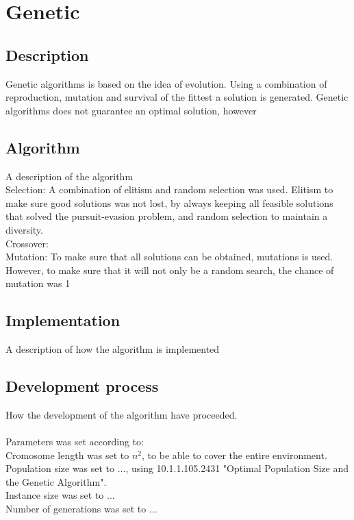 \section{Genetic}
\subsection{Description}
Genetic algorithms is based on the idea of evolution. Using a combination of reproduction, mutation and survival of the fittest a solution is generated. Genetic algorithms does not guarantee an optimal solution, however 
\subsection{Algorithm}
A description of the algorithm\\
Selection: A combination of elitism and random selection was used. Elitism to make sure good solutions was not lost, by always keeping all feasible solutions that solved the pursuit-evasion problem, and random selection to maintain a diversity.\\
Crossover: \\
Mutation: To make sure that all solutions can be obtained, mutations is used. However, to make sure that it will not only be a random search, the chance of mutation was 1%

\subsection{Implementation}
A description of how the algorithm is implemented
\subsection{ Development process}
How the development of the algorithm have proceeded.\\
\\
Parameters was set according to:\\
Cromosome length was set to \begin{math}n^2\end{math}, to be able to cover the entire environment.\\
Population size was set to ..., using 10.1.1.105.2431 "Optimal Population Size and the Genetic Algorithm".\\
Instance size was set to ...\\
Number of generations was set to ...\\
